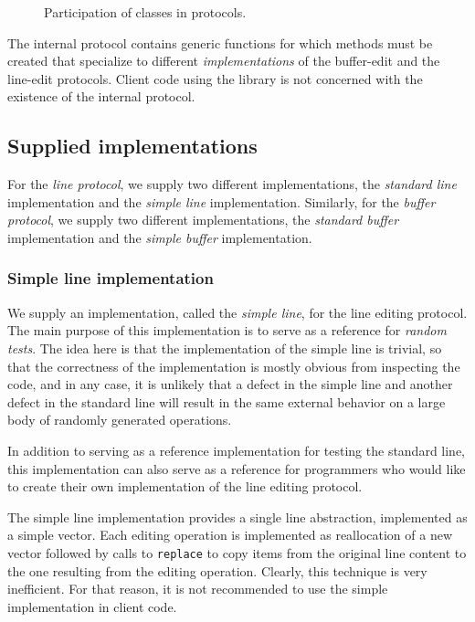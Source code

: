 \begin{figure}
\begin{center}
\end{center}
\caption{\label{fig-participation}
Participation of classes in protocols.}
\end{figure}

The internal protocol contains generic functions for which methods
must be created that specialize to different \emph{implementations} of
the buffer-edit and the line-edit protocols.  Client code using the
library is not concerned with the existence of the internal protocol.

\subsection{Supplied implementations}

For the \emph{line protocol}, we supply two different implementations,
the \emph{standard line} implementation and the \emph{simple line}
implementation.  Similarly, for the \emph{buffer protocol}, we supply
two different implementations, the \emph{standard buffer} implementation
and the \emph{simple buffer} implementation.

\subsubsection{Simple line implementation}

We supply an implementation, called the \emph{simple line}, for
the line editing protocol.  The main purpose of this implementation is
to serve as a reference for \emph{random tests}.  The idea here is
that the implementation of the simple line is trivial, so that the
correctness of the implementation is mostly obvious from inspecting
the code, and in any case, it is unlikely that a defect in the simple
line and another defect in the standard line will result in the same
external behavior on a large body of randomly generated operations.

In addition to serving as a reference implementation for testing the
standard line, this implementation can also serve as a reference for
programmers who would like to create their own implementation of the
line editing protocol.

The simple line implementation provides a single line abstraction,
implemented as a \commonlisp{} simple vector.  Each editing operation
is implemented as reallocation of a new vector followed by calls to
\texttt{replace} to copy items from the original line content to the
one resulting from the editing operation.  Clearly, this technique is
very inefficient.  For that reason, it is not recommended to use the
simple implementation in client code.

